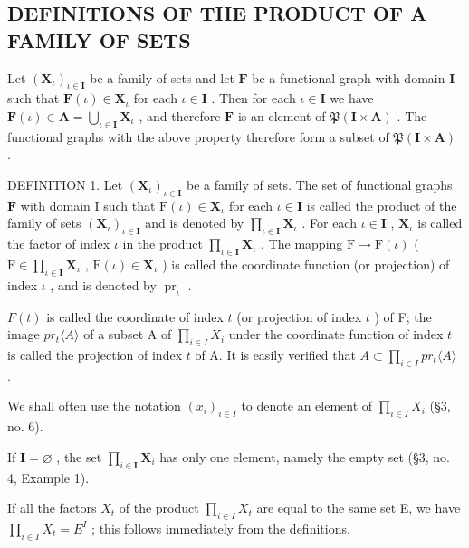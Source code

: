 \subsection{DEFINITIONS OF THE PRODUCT OF A FAMILY OF SETS}

Let \((\mathbf{X}_{\iota})_{\iota \in \mathbf{I}}\) be a family of sets and let \(\mathbf{F}\) be a functional graph with domain \(\mathbf{I}\) such that \(\mathbf{F}(\iota) \in \mathbf{X}_{\iota}\) for each \(\iota \in \mathbf{I}\) . Then for each \(\iota \in \mathbf{I}\) we have \(\mathbf{F}(\iota) \in \mathbf{A} = \bigcup_{\iota \in \mathbf{I}} \mathbf{X}_{\iota}\) , and therefore \(\mathbf{F}\) is an element of \(\mathfrak{P}(\mathbf{I} \times \mathbf{A})\) . The functional graphs with the above property therefore form a subset of \(\mathfrak{P}(\mathbf{I} \times \mathbf{A})\) .

DEFINITION 1. Let \((\mathbf{X}_{\iota})_{\iota \in \mathbf{I}}\) be a family of sets. The set of functional graphs \(\mathbf{F}\) with domain I such that \(\mathrm{F}(\iota) \in \mathbf{X}_{\iota}\) for each \(\iota \in \mathbf{I}\) is called the product of the family of sets \((\mathbf{X}_{\iota})_{\iota \in \mathbf{I}}\) and is denoted by \(\prod_{\iota \in \mathbf{I}} \mathbf{X}_{\iota}\) . For each \(\iota \in \mathbf{I}\) , \(\mathbf{X}_{\iota}\) is called the factor of index \(\iota\) in the product \(\prod_{\iota \in \mathbf{I}} \mathbf{X}_{\iota}\) . The mapping \(\mathrm{F} \to \mathrm{F}(\iota)\) ( \(\mathrm{F} \in \prod_{\iota \in \mathbf{I}} \mathbf{X}_{\iota}\) , \(\mathrm{F}(\iota) \in \mathbf{X}_{\iota}\) ) is called the coordinate function (or projection) of index \(\iota\) , and is denoted by \(\operatorname{pr}_{\iota}\) .

\(F(t)\) is called the coordinate of index \(t\) (or projection of index \(t\) ) of F; the image \(pr_{t}\langle A\rangle\) of a subset A of \(\prod_{i\in I}X_{i}\) under the coordinate function of index \(t\) is called the projection of index \(t\) of A. It is easily verified that \(A\subset\prod_{i\in I}pr_{t}\langle A\rangle\) .

We shall often use the notation \((x_{i})_{i\in I}\) to denote an element of \(\prod_{i\in I}X_{i}\) (§3, no. 6).

If \(\mathbf{I} = \varnothing\) , the set \(\prod_{i\in \mathbf{I}}\mathbf{X}_i\) has only one element, namely the empty set (§3, no. 4, Example 1).

If all the factors \(X_{t}\) of the product \(\prod_{i\in I}X_{t}\) are equal to the same set E, we have \(\prod_{i\in I}X_{t}=E^{I}\) ; this follows immediately from the definitions.

